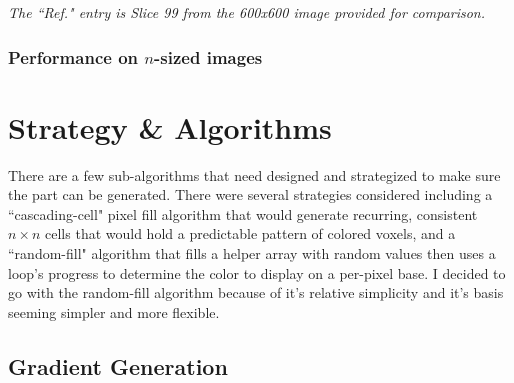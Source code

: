 \documentclass{article}
\begin{document}
\begin{multicols}{2}
{\begin{tikzpicture}
\end{tikzpicture}

}

\noindent
\textit{The ``Ref." entry is Slice 99 from the 600x600 image provided for comparison.}

\subsubsection{Performance on $n$-sized images}


\scaledata


\section{Strategy \& Algorithms}
There are a few sub-algorithms that need designed and strategized to make sure the part can be generated. There were several strategies considered including a ``cascading-cell" pixel fill algorithm that would generate recurring, consistent $n\times n$ cells that would hold a predictable pattern of colored voxels, and a ``random-fill" algorithm that fills a helper array with random values then uses a loop's progress to determine the color to display on a per-pixel base. I decided to go with the random-fill algorithm because of it's relative simplicity and it's basis seeming simpler and more flexible.

\subsection{Gradient Generation} \label{gradient generation}


\end{multicols}
\end{document}
